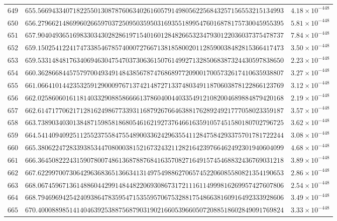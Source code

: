 \documentclass[12pt,reqno]{amsart}
\theoremstyle{remark}
\begin{document}
\begin{longtable}{clc}
$649$ & $655.5669433407182255013087876063402616057914980562256843257156553215134993$ & $4.18\times 10^{-448}$ \\
$650$ & $656.2796621486996026659703725095035950316935518995476016878175730045955395$ & $5.81\times 10^{-448}$ \\
$651$ & $657.9040493651698330343028286197154016012848266532347930122036037375478737$ & $7.84\times 10^{-448}$ \\
$652$ & $659.1502541224174733854678574000727667138185800201128590038482815366417473$ & $3.50\times 10^{-448}$ \\
$653$ & $659.5331484817634069463047547037306361507614992713285068387324430597838650$ & $2.23\times 10^{-448}$ \\
$654$ & $660.3628668445757970049349148438567874768689772090017005732617410635938807$ & $3.27\times 10^{-448}$ \\
$655$ & $661.0664101442353259129000976713742148727133748034911870603878122866123769$ & $3.12\times 10^{-448}$ \\
$656$ & $662.0258606016118140332908858666613786040044033549121082004689884879420168$ & $2.19\times 10^{-448}$ \\
$657$ & $662.6147177062171281624986773393116879267664638817628924921777058023359187$ & $3.57\times 10^{-448}$ \\
$658$ & $663.7389034030138487159858186805461621927376466163591057451580180702796725$ & $3.62\times 10^{-448}$ \\
$659$ & $664.5414094092511255237558475548900336242963554112847584293375701781722244$ & $3.08\times 10^{-448}$ \\
$660$ & $665.3806224728339385344708000381521673243211282164239766462492301940604099$ & $4.68\times 10^{-448}$ \\
$661$ & $666.3645082224315907800748613687887684163570827164915745468832436769031218$ & $3.89\times 10^{-448}$ \\
$662$ & $667.6229970073064296368365136634131497549886270657452206085580821354190653$ & $2.86\times 10^{-448}$ \\
$663$ & $668.0674596713614886044299148448220693086731721116114999816269957427607806$ & $2.54\times 10^{-448}$ \\
$664$ & $668.7946969425424093864783595471535595706753288175486638160916492333928606$ & $3.49\times 10^{-448}$ \\
$665$ & $670.4000889851414046392538875687903190216605396605072088518602849091769824$ & $3.33\times 10^{-448}$ \\

\end{longtable}
\end{document}

